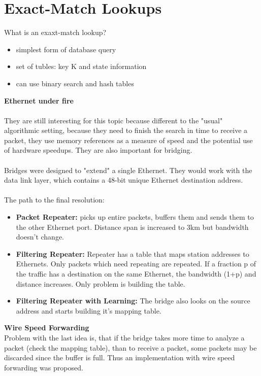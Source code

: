 \chapter{Exact-Match Lookups} \label{CHAP:EXMATCH}

What is an exaxt-match lookup?
\begin{itemize}
\item simplest form of database query
\item set of tubles: key K and state information
\item can use binary search and hash tables
\end{itemize}
\textbf{Ethernet under fire}
\\
\\
They are still interesting for this topic because different to the "usual" algorithmic setting, because they need to finish the search in time to receive a packet, they use memory references as a measure of speed and the potential use of hardware speedups. They are also important for bridging.\\
\\
Bridges were designed to "extend" a single Ethernet. They would work with the data link layer, which contains a 48-bit unique Ethernet destination address.\\
\\
The path to the final resolution:
\begin{itemize}
\item \textbf{Packet Repeater:} picks up entire packets, buffers them and sends them to the other Ethernet port. Distance span is increased to 3km but bandwidth doesn't change.
\item \textbf{Filtering Repeater:} Repeater has a table that maps station addresses to Ethernets. Only packets which need repeating are repeated. If a fraction p of the traffic has a destination on the same Ethernet, the bandwidth (1+p) and distance increases. Only problem is building the table.
\item \textbf{Filtering Repeater with Learning:} The bridge also looks on the source address and starts building it's mapping table.
\end{itemize}
\textbf{Wire Speed Forwarding}
\\
Problem with the last idea is, that if the bridge takes more time to analyze a packet (check the mapping table), than to receive a packet, some packets may be discarded since the buffer is full. Thus an implementation with wire speed forwarding was proposed.\\
